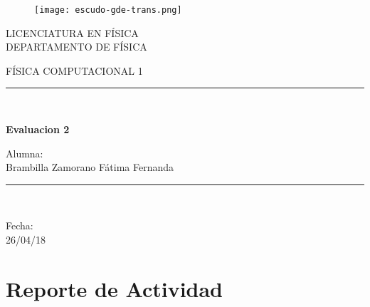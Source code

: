\documentclass{article}
\begin{document}
\begin{titlepage}
\begin{center}
    \vspace*{-1in}
    \begin{figure}[htb]
    \begin{center}
    \texttt{[image: escudo-gde-trans.png]}
    \end{center}
\end{figure}
\begin{center}
LICENCIATURA EN FÍSICA \\
\vspace*{0.15in}
DEPARTAMENTO DE FÍSICA \\
\vspace*{0.6in}
\begin{large}
FÍSICA COMPUTACIONAL 1 \\
\end{large}
\vspace*{0.2in}
\rule{80mm}{0.1mm}\\
\vspace*{0.1in}
\begin{large}
\textbf{Evaluacion 2\\ }
\end{large}
\vspace*{0.3in}
\begin{large}
Alumna: \\
\vspace*{0.1in}
Brambilla Zamorano Fátima Fernanda\\
\end{large}
\vspace*{0.3in}
\rule{80mm}{0.1mm}\\
\vspace*{0.1in}
\begin{large}
Fecha: \\ 26/04/18\\
\end{large}
\end{center}
\end{center}
\end{titlepage}

\section {Reporte de Actividad}
\end{document}
